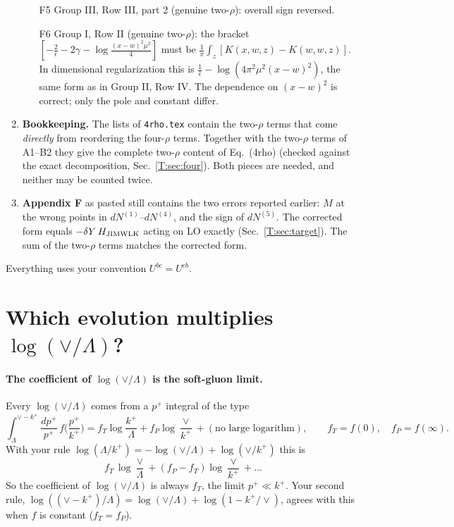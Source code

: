 \documentclass[10pt]{article}
\numberwithin{equation}{section}
\begin{document}
\begin{enumerate}
\begin{itemize}
\item[F5] Group III, Row III, part 2 (genuine two-$\rho$): overall sign reversed.
\item[F6] Group I, Row II (genuine two-$\rho$): the bracket $[-\frac2\epsilon-2\gamma-\log\frac{(x-w)^2\mu^2}{4}]$ must be $\frac1\pi\int_z[K(x,w,z)-K(w,w,z)]$. In dimensional regularization this is $\frac1{\bar\epsilon}-\log(4\pi^2\mu^2(x-w)^2)$, the same form as in Group II, Row IV. The dependence on $(x-w)^2$ is correct; only the pole and constant differ.
\end{itemize}
\item \textbf{Bookkeeping.} The lists of \texttt{4rho.tex} contain the two-$\rho$ terms that come \emph{directly} from reordering the four-$\rho$ terms. Together with the two-$\rho$ terms of A1--B2 they give the complete two-$\rho$ content of Eq.~(4rho) (checked against the exact decomposition, Sec.~\ref{T:sec:four}). Both pieces are needed, and neither may be counted twice.
\item \textbf{Appendix F} as pasted still contains the two errors reported earlier: $M$ at the wrong points in $dN^{(1)}$--$dN^{(4)}$, and the sign of $dN^{(5)}$. The corrected form equals $-\delta Y\,H_{\rm JIMWLK}$ acting on LO exactly (Sec.~\ref{T:sec:target}). The sum of the two-$\rho$ terms matches the corrected form.
\end{enumerate}
Everything uses your convention $U^{bc}=U^{cb}$.


\section{Which evolution multiplies \texorpdfstring{$\log(\vee/\Lambda)$}{log(vee/Lambda)}?}\label{T:sec:which}
\paragraph{The coefficient of $\log(\vee/\Lambda)$ is the soft-gluon limit.} Every $\log(\vee/\Lambda)$ comes from a $p^+$ integral of the type
\begin{equation}
\int_\Lambda^{\vee-k^+}\frac{dp^+}{p^+}\,f\Big(\frac{p^+}{k^+}\Big)=f_T\log\frac{k^+}{\Lambda}+f_P\log\frac{\vee}{k^+}+(\text{no large logarithm}),\qquad f_T=f(0),\quad f_P=f(\infty).
\end{equation}
With your rule $\log(\Lambda/k^+)=-\log(\vee/\Lambda)+\log(\vee/k^+)$ this is
\begin{equation}
f_T\,\log\frac{\vee}{\Lambda}+(f_P-f_T)\log\frac{\vee}{k^+}+\dots
\end{equation}
So the coefficient of $\log(\vee/\Lambda)$ is always $f_T$, the limit $p^+\ll k^+$. Your second rule, $\log((\vee-k^+)/\Lambda)=\log(\vee/\Lambda)+\log(1-k^+/\vee)$, agrees with this when $f$ is constant ($f_T=f_P$).
\end{document}
